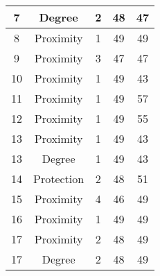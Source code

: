 \documentclass[results.tex]{subfiles}
\begin{document}
\begin{center}
\begin{tabular}{| c || c | c | c | c |}
            \hline
            7                       & Degree                       & 2                      & 48                      & 47                   \\
            \hline
            8                       & Proximity                    & 1                      & 49                      & 49                   \\
            \hline
            9                       & Proximity                    & 3                      & 47                      & 47                   \\
            \hline
            10                      & Proximity                    & 1                      & 49                      & 43                   \\
            \hline
            11                      & Proximity                    & 1                      & 49                      & 57                   \\
            \hline
            12                      & Proximity                    & 1                      & 49                      & 55                   \\
            \hline
            13                      & Proximity                    & 1                      & 49                      & 43                   \\
            \hline
            13                      & Degree                       & 1                      & 49                      & 43                   \\
            \hline
            14                      & Protection                   & 2                      & 48                      & 51                   \\
            \hline
            15                      & Proximity                    & 4                      & 46                      & 49                   \\
            \hline
            16                      & Proximity                    & 1                      & 49                      & 49                   \\
            \hline
            17                      & Proximity                    & 2                      & 48                      & 49                   \\
            \hline
            17                      & Degree                       & 2                      & 48                      & 49                   \\

\end{tabular}
\end{center}
\end{document}
